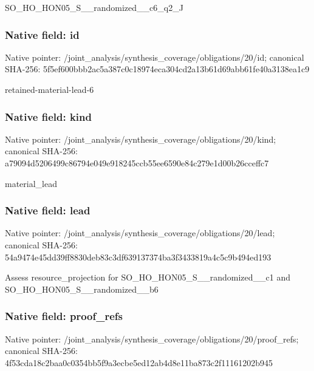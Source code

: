 \documentclass[10pt,a4paper]{article}
\begin{document}
\begingroup\raggedright\sloppy SO\_\allowbreak{}HO\_\allowbreak{}HON05\_\allowbreak{}S\_\allowbreak{}\_\allowbreak{}randomized\_\allowbreak{}\_\allowbreak{}c6\_\allowbreak{}q2\_\allowbreak{}J\par\endgroup

\subsubsection{Native field: id}
Native pointer: /joint\_\allowbreak{}analysis/synthesis\_\allowbreak{}coverage/obligations/20/id; canonical SHA-256: 5f5ef600bbb2ac5a387c0c18974eca304cd2a13b61d69abb61fe40a3138ea1c9

\begingroup\raggedright\sloppy retained-material-lead-6\par\endgroup

\subsubsection{Native field: kind}
Native pointer: /joint\_\allowbreak{}analysis/synthesis\_\allowbreak{}coverage/obligations/20/kind; canonical SHA-256: a79094d5206499c86794e049e918245ccb55ee6590e84c279e1d00b26cceffc7

\begingroup\raggedright\sloppy material\_\allowbreak{}lead\par\endgroup

\subsubsection{Native field: lead}
Native pointer: /joint\_\allowbreak{}analysis/synthesis\_\allowbreak{}coverage/obligations/20/lead; canonical SHA-256: 54a9474e45dd39ff8830deb83c3df639137374ba3f3433819a4c5c9b494ed193

\begingroup\raggedright\sloppy Assess resource\_\allowbreak{}projection for SO\_\allowbreak{}HO\_\allowbreak{}HON05\_\allowbreak{}S\_\allowbreak{}\_\allowbreak{}randomized\_\allowbreak{}\_\allowbreak{}c1 and SO\_\allowbreak{}HO\_\allowbreak{}HON05\_\allowbreak{}S\_\allowbreak{}\_\allowbreak{}randomized\_\allowbreak{}\_\allowbreak{}b6\par\endgroup

\subsubsection{Native field: proof\_\allowbreak{}refs}
Native pointer: /joint\_\allowbreak{}analysis/synthesis\_\allowbreak{}coverage/obligations/20/proof\_\allowbreak{}refs; canonical SHA-256: 4f53cda18c2baa0c0354bb5f9a3ecbe5ed12ab4d8e11ba873c2f11161202b945
\end{document}
